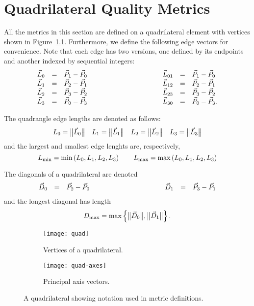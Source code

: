 \chapter{Quadrilateral Quality Metrics}

All the metrics in this section are defined on a quadrilateral element with vertices
shown in Figure~\ref{f:quad}. Furthermore, we define the following edge vectors for
convenience. Note that each edge has two versions, one defined by its endpoints and
another indexed by sequential integers:
\begin{equation*}
\begin{array}{lcl}
\vec L_0 &=& \vec P_1 - \vec P_0\\
\vec L_1 &=& \vec P_2 - \vec P_1\\
\vec L_2 &=& \vec P_3 - \vec P_2\\
\vec L_3 &=& \vec P_0 - \vec P_3
\end{array}\rule{10em}{0pt}
\begin{array}{lcl}
\vec L_{01} &=& \vec P_1 - \vec P_0\\
\vec L_{12} &=& \vec P_2 - \vec P_1\\
\vec L_{23} &=& \vec P_3 - \vec P_2\\
\vec L_{30} &=& \vec P_0 - \vec P_3.
\end{array}
\end{equation*}

The quadrangle edge lengths are denoted as follows:
\[
L_0 = \big\lVert{\vec L_0}\big\rVert\quad
L_1 = \big\lVert{\vec L_1}\big\rVert\quad
L_2 = \big\lVert{\vec L_2}\big\rVert\quad
L_3 = \big\lVert{\vec L_3}\big\rVert
\]
and the largest and smallest edge lenghts are, respectively,
\[
L_{\min} = \min\left(L_0, L_1, L_2, L_3\right)
  \rule{2em}{0pt}
L_{\max} = \max\left(L_0, L_1, L_2, L_3\right)
\]

The diagonals of a quadrilateral are denoted
\begin{equation*}
\begin{array}{lcl}
\vec D_0 &=& \vec P_2 - \vec P_0
\end{array}\rule{10em}{0pt}
\begin{array}{lcl}
\vec D_1 &=& \vec P_3 - \vec P_1
\end{array}
\end{equation*}
and the longest diagonal has length
\[
D_{\max} = \max\left\{ \big\lVert{\vec D_0}\big\rVert, \big\lVert{\vec D_1}\big\rVert \right\}.
\]

\begin{figure}
  \centering
  \begin{subfigure}[b]{0.49\textwidth}
    \centering
    \texttt{[image: quad]}
    \caption{Vertices of a quadrilateral.}
  \end{subfigure}
  \hfill
  \begin{subfigure}[b]{0.49\textwidth}
    \centering
    \texttt{[image: quad-axes]}
    \caption{Principal axis vectors.}
  \end{subfigure}
  \caption{A quadrilateral showing notation used in metric definitions.\label{f:quad}}
\end{figure}

